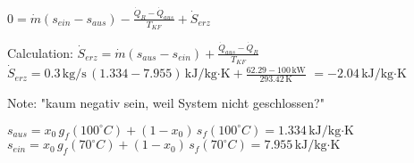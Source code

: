 \( 0 = \dot{m} (s_{ein} - s_{aus}) - \frac{\dot{Q}_R - \dot{Q}_{aus}}{T_{KF}} + \dot{S}_{erz} \)  

Calculation:  
\( \dot{S}_{erz} = \dot{m} (s_{aus} - s_{ein}) + \frac{\dot{Q}_{aus} - \dot{Q}_R}{T_{KF}} \)  
\( \dot{S}_{erz} = 0.3 \, \text{kg/s} \, (1.334 - 7.955) \, \text{kJ/kg·K} + \frac{62.29 - 100 \, \text{kW}}{293.42 \, \text{K}} \)  
\( = -2.04 \, \text{kJ/kg·K} \)  

Note:  
"kaum negativ sein, weil System nicht geschlossen?"  

\( s_{aus} = x_0 \, g_f (100^\circ C) + (1 - x_0) \, s_f (100^\circ C) = 1.334 \, \text{kJ/kg·K} \)  
\( s_{ein} = x_0 \, g_f (70^\circ C) + (1 - x_0) \, s_f (70^\circ C) = 7.955 \, \text{kJ/kg·K} \)